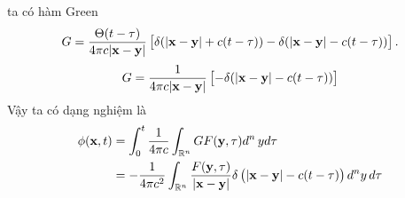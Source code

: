 \documentclass{report}
\newcommand{\f}[2]{\dfrac{#1}{#2}}
\begin{document}
	ta có hàm Green
	\begin{equation}
		\begin{aligned}
			G 
			&=   \f{\Theta (t - \tau)}{4\pi c \abs{\mathbf{x - y}}} \left[ \delta( \abs{\mathbf{x - y}} + c(t - \tau)) - \delta( \abs{\mathbf{x - y}} - c(t - \tau)) \right].\\
		\end{aligned}
	\end{equation}
\begin{gather}
	G = \f{1}{4\pi c \abs{\mathbf{x - y}}} \left[ - \delta( \abs{\mathbf{x - y}} - c(t - \tau)) \right]
\end{gather}
Vậy ta có dạng nghiệm là
\begin{equation}
	\begin{aligned}
		\phi(\mathbf{x},t) 
		&= \int_{0}^{t} \f{1}{4\pi c} \int_{\mathbb{R}^{n}} G F(\mathbf{y},\tau) d^{n}\, y d\tau \\
		&= -\f{1}{4 \pi c^{2}} \int_{\mathbb{R}^{n}} \f{F(\mathbf{y},\tau)}{\abs{\mathbf{x - y}}} \delta\left( \abs{\mathbf{x - y}} - c(t - \tau) \right) d^{n}y\, d\tau
	\end{aligned}
\end{equation}
	
	
	
	
	
	
	
	
	
	
	
	
	
	
	
	
	
	
	
	
	
	
	
	
	
	
	
	
	
	
	
	
	
	
	
	
	
	
	
	
	
	
	
	
	
	
	
	
	
	
	
	
	
	
	
	
	
	
	
	
	
	
	
\end{document}
